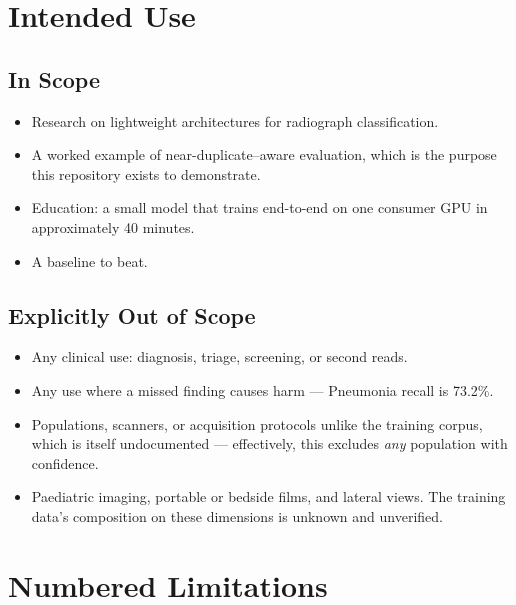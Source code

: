 \documentclass[11pt,a4paper,oneside]{report}
\begin{document}
\section{Intended Use}

\subsection{In Scope}
\begin{itemize}
\item Research on lightweight architectures for radiograph classification.
\item A worked example of near-duplicate–aware evaluation, which is the
  purpose this repository exists to demonstrate.
\item Education: a small model that trains end-to-end on one consumer GPU in
  approximately 40 minutes.
\item A baseline to beat.
\end{itemize}

\subsection{Explicitly Out of Scope}
\begin{itemize}
\item Any clinical use: diagnosis, triage, screening, or second reads.
\item Any use where a missed finding causes harm --- Pneumonia recall is
  73.2\%.
\item Populations, scanners, or acquisition protocols unlike the training
  corpus, which is itself undocumented --- effectively, this excludes
  \emph{any} population with confidence.
\item Paediatric imaging, portable or bedside films, and lateral views. The
  training data's composition on these dimensions is unknown and unverified.
\end{itemize}

\section{Numbered Limitations}
\end{document}
